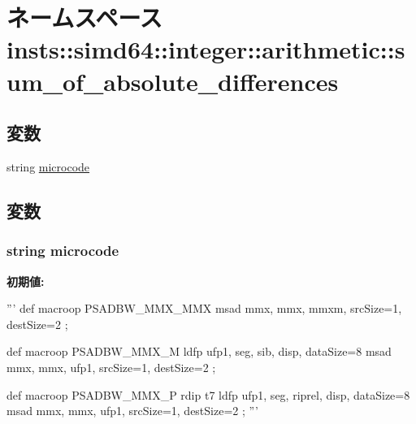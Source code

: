\hypertarget{namespaceinsts_1_1simd64_1_1integer_1_1arithmetic_1_1sum__of__absolute__differences}{
\section{ネームスペース insts::simd64::integer::arithmetic::sum\_\-of\_\-absolute\_\-differences}
\label{namespaceinsts_1_1simd64_1_1integer_1_1arithmetic_1_1sum__of__absolute__differences}
}
\subsection*{変数}
\begin{DoxyCompactItemize}
\item 
string \hyperlink{namespaceinsts_1_1simd64_1_1integer_1_1arithmetic_1_1sum__of__absolute__differences_a770f11a173e99389a8802f0107ed8f52}{microcode}
\end{DoxyCompactItemize}


\subsection{変数}
\hypertarget{namespaceinsts_1_1simd64_1_1integer_1_1arithmetic_1_1sum__of__absolute__differences_a770f11a173e99389a8802f0107ed8f52}{
\subsubsection[{microcode}]{\setlength{\rightskip}{0pt plus 5cm}string {\bf microcode}}}
\label{namespaceinsts_1_1simd64_1_1integer_1_1arithmetic_1_1sum__of__absolute__differences_a770f11a173e99389a8802f0107ed8f52}
{\bfseries 初期値:}
\begin{DoxyCode}
'''
def macroop PSADBW_MMX_MMX {
    msad mmx, mmx, mmxm, srcSize=1, destSize=2
};

def macroop PSADBW_MMX_M {
    ldfp ufp1, seg, sib, disp, dataSize=8
    msad mmx, mmx, ufp1, srcSize=1, destSize=2
};

def macroop PSADBW_MMX_P {
    rdip t7
    ldfp ufp1, seg, riprel, disp, dataSize=8
    msad mmx, mmx, ufp1, srcSize=1, destSize=2
};
'''
\end{DoxyCode}
